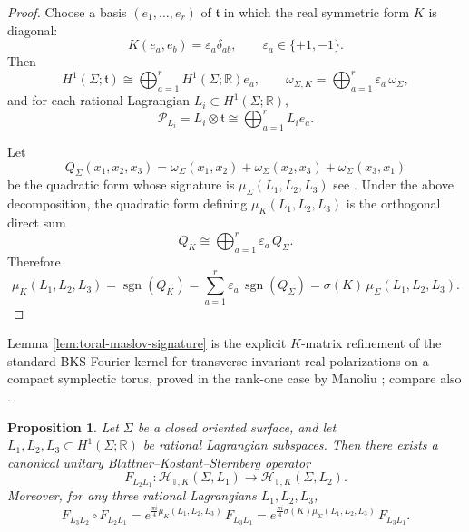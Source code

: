 \documentclass[12pt]{amsart}
\numberwithin{equation}{section}
\newtheorem{prop}[theorem]{Proposition}
\begin{document}
\begin{proof}
Choose a basis $(e_1,\dots,e_r)$ of $\mathfrak t$ in which the real symmetric form $K$
is diagonal:
\[
K(e_a,e_b)=\varepsilon_a\delta_{ab},
\qquad
\varepsilon_a\in\{+1,-1\}.
\]
Then
\[
H^1(\Sigma;\mathfrak t)
\cong
\bigoplus_{a=1}^r H^1(\Sigma;\mathbb R)e_a,
\qquad
\omega_{\Sigma,K}
=
\bigoplus_{a=1}^r \varepsilon_a\,\omega_\Sigma,
\]
and for each rational Lagrangian $L_i\subset H^1(\Sigma;\mathbb R)$,
\[
\mathcal P_{L_i}
=
L_i\otimes\mathfrak t
\cong
\bigoplus_{a=1}^r L_i e_a.
\]

Let
\[
Q_\Sigma(x_1,x_2,x_3)
=
\omega_\Sigma(x_1,x_2)+\omega_\Sigma(x_2,x_3)+\omega_\Sigma(x_3,x_1)
\]
be the quadratic form whose signature is $\mu_\Sigma(L_1,L_2,L_3)$ see \cite[Secs.~IV, VI]{Manoliu1}.
Under the above decomposition, the quadratic form defining
$\mu_K(L_1,L_2,L_3)$ is the orthogonal direct sum
\[
Q_K
\cong
\bigoplus_{a=1}^r \varepsilon_a\, Q_\Sigma.
\]
Therefore
\[
\mu_K(L_1,L_2,L_3)
=
\operatorname{sgn}(Q_K)
=
\sum_{a=1}^r \varepsilon_a\,\operatorname{sgn}(Q_\Sigma)
=
\sigma(K)\,\mu_\Sigma(L_1,L_2,L_3).
\]
\end{proof}
Lemma \ref{lem:toral-maslov-signature} is the explicit \(K\)-matrix refinement of the
standard BKS Fourier kernel for transverse invariant real polarizations on a compact
symplectic torus, proved in the rank-one case by Manoliu
\cite[Secs.~IV, VI]{Manoliu1}; compare also \cite[Sec.~V]{Manoliu2}.
\begin{prop}
\label{prop:toral-BKS}
Let $\Sigma$ be a closed oriented surface, and let
$L_1,L_2,L_3\subset H^1(\Sigma;\mathbb R)$ be rational Lagrangian subspaces.
Then there exists a canonical unitary
Blattner--Kostant--Sternberg operator
\[
F_{L_2L_1}:
\mathcal H_{\mathbb T,K}(\Sigma,L_1)\longrightarrow
\mathcal H_{\mathbb T,K}(\Sigma,L_2).
\]
Moreover, for any three rational Lagrangians $L_1,L_2,L_3$,
\begin{equation}
F_{L_3L_2}\circ F_{L_2L_1}
=
e^{\frac{\pi i}{4}\mu_K(L_1,L_2,L_3)}\,F_{L_3L_1}
=
e^{\frac{\pi i}{4}\sigma(K)\mu_\Sigma(L_1,L_2,L_3)}\,F_{L_3L_1}.
\end{equation}
\end{prop}
\end{document}

